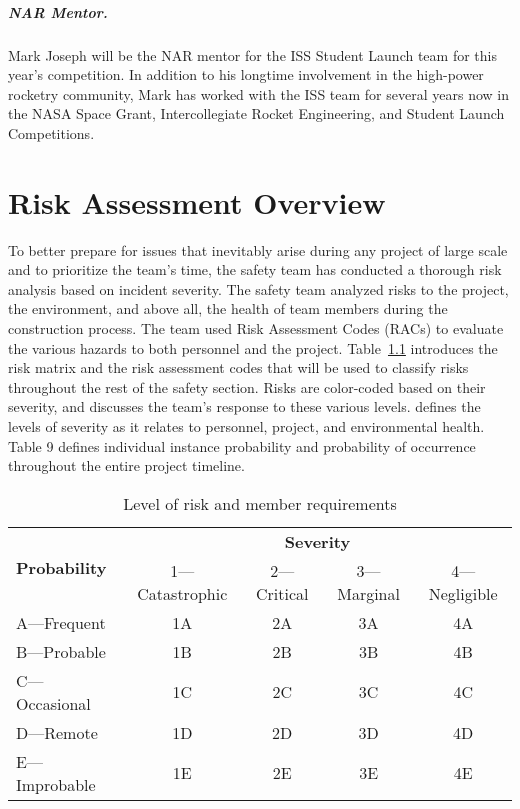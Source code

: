 \paragraph{NAR Mentor.}

Mark Joseph will be the NAR mentor for the ISS Student Launch team for this year's competition. In addition to his longtime involvement in the high-power rocketry community, Mark has worked with the ISS team for several years now in the NASA Space Grant, Intercollegiate Rocket Engineering, and Student Launch Competitions.

\chapter{Risk Assessment Overview}

To better prepare for issues that inevitably arise during any project of large scale and to prioritize the team's time, the safety team has conducted a thorough risk analysis based on incident severity. The safety team analyzed risks to the project, the environment, and above all, the health of team members during the construction process. The team used Risk Assessment Codes (RACs) to evaluate the various hazards to both personnel and the project. Table~\ref{tab:level of risk and member requirements} introduces the risk matrix and the risk assessment codes that will be used to classify risks throughout the rest of the safety section. Risks are color-coded based on their severity, and  discusses the team's response to these various levels.  defines the levels of severity as it relates to personnel, project, and environmental health. Table 9 defines individual instance probability and probability of occurrence throughout the entire project timeline.

\begin{table}[H]
    \centering
    \caption{Level of risk and member requirements}
    \label{tab:level of risk and member requirements}
    \begin{tabularx}{0.8\linewidth}{X c c c c}
        \toprule
       \multirow{2}{*}{\textbf{Probability}} & \multicolumn{4}{c}{\textbf{Severity}} \\
       \cmidrule(l){2-5}
        & 1---Catastrophic & 2---Critical & 3---Marginal & 4---Negligible \\
       \midrule
       A---Frequent & \cellcolor{red!25} 1A & \cellcolor{red!25} 2A & \cellcolor{orange!25} 3A & \cellcolor{green!25} 4A \\
       B---Probable & \cellcolor{red!25} 1B & \cellcolor{red!25} 2B & \cellcolor{orange!25} 3B & \cellcolor{green!25} 4B \\
       C---Occasional & \cellcolor{red!25} 1C & \cellcolor{orange!25} 2C & \cellcolor{orange!25} 3C & 4C \\
       D---Remote & \cellcolor{orange!25} 1D & \cellcolor{orange!25} 2D & \cellcolor{green!25} 3D & 4D \\
       E---Improbable & \cellcolor{green!25} 1E & \cellcolor{green!25} 2E & \cellcolor{green!25} 3E & 4E \\
       \bottomrule
    \end{tabularx}
\end{table}